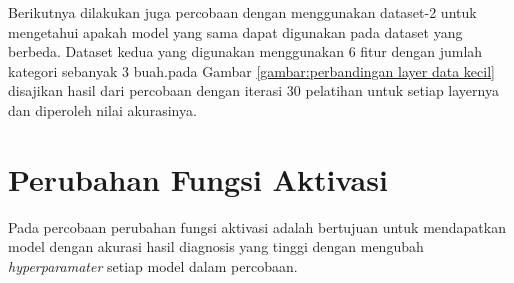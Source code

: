 %	
Berikutnya dilakukan juga percobaan dengan menggunakan dataset-2 untuk mengetahui apakah model yang sama dapat digunakan pada dataset yang berbeda. Dataset kedua yang digunakan menggunakan 6 fitur dengan jumlah kategori sebanyak 3 buah.pada Gambar \ref{gambar:perbandingan layer data kecil} disajikan hasil dari percobaan dengan iterasi 30 pelatihan untuk setiap layernya dan diperoleh nilai akurasinya.\par

%	

\begin{minipage}{\linewidth}
	\centering
	\label{gambar:perbandingan layer data kecil}
\end{minipage}

\section{Perubahan Fungsi Aktivasi}
Pada percobaan perubahan fungsi aktivasi adalah bertujuan untuk mendapatkan model dengan akurasi hasil diagnosis yang tinggi dengan mengubah \textit{hyperparamater} setiap model dalam percobaan.
\begin{minipage}{\linewidth}
	\centering
	
	\label{gambar:perbandingan fungsi aktivasi data besar}
\end{minipage}

\begin{minipage}{\linewidth}
	\centering
	
	\label{gambar:perbandingan fungsi aktivasi data kecil}
\end{minipage}


